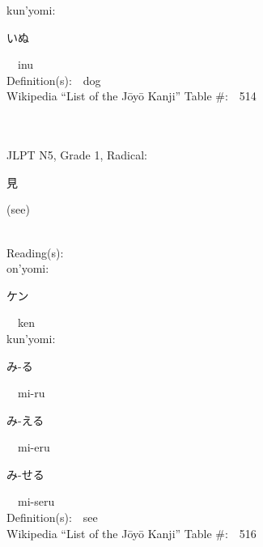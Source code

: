 \begin{multicols}{2}
{\hspace*{1em}}kun'yomi:\ \ \\
{\hspace*{2em}}{\begin{CJK}{UTF8}{min} いぬ \end{CJK}}\ \ inu\ \ \\
Definition(s):\ \ dog \\
Wikipedia ``List of the J\=oy\=o Kanji'' Table \#:\ \ 514 \\
\ \ \\
{\fontsize{34pt}{40pt}  }\ \ \\  %
{JLPT N5, Grade 1, Radical:\ \ {\begin{CJK}{UTF8}{min} 見 \end{CJK}} (see) } \\
Reading(s):\ \ \\
{\hspace*{1em}}on'yomi:\ \ \\
{\hspace*{2em}}{\begin{CJK}{UTF8}{min} ケン \end{CJK}}\ \ ken\ \ \\
{\hspace*{1em}}kun'yomi:\ \ \\
{\hspace*{2em}}{\begin{CJK}{UTF8}{min} み-る \end{CJK}}\ \ mi-ru\ \ \\
{\hspace*{2em}}{\begin{CJK}{UTF8}{min} み-える \end{CJK}}\ \ mi-eru\ \ \\
{\hspace*{2em}}{\begin{CJK}{UTF8}{min} み-せる \end{CJK}}\ \ mi-seru\ \ \\
Definition(s):\ \ see \\
Wikipedia ``List of the J\=oy\=o Kanji'' Table \#:\ \ 516 \\
\ \ \\
{\fontsize{34pt}{40pt}  }\ \ \\  %

\end{multicols}
